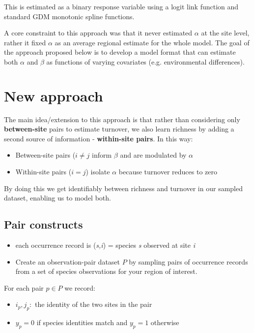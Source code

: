 \documentclass{article}
\begin{document}
This is estimated as a binary response variable using a logit link function and standard GDM monotonic spline functions.

A core constraint to this approach was that it never estimated $\alpha$ at the site level, rather it fixed $\alpha$ as an average regional estimate for the whole model. The goal of the approach proposed below is to develop a model format that can estimate both $\alpha$ and $\beta$ as functions of varying covariates (e.g. environmental differences).

\section{New approach}

The main idea/extension to this approach is that rather than considering only \textbf{between-site} pairs to estimate turnover, we also learn richness by adding a second source of information - \textbf{within-site pairs}. In this way:

\begin{itemize}
    \item Between-site pairs ($i \neq j$ inform $\beta$ and are modulated by $\alpha$
    \item Within-site pairs ($i = j$) isolate $\alpha$ because turnover reduces to zero
\end{itemize}

By doing this we get identifiably between richness and turnover in our sampled dataset, enabling us to model both.

\subsection{Pair constructs}

\begin{itemize}
    \item each occurrence record is (\textit{s,i}) = species \textit{s} observed at site \textit{i}
    \item Create an observation-pair dataset $P$ by sampling pairs of occurrence records from a set of species observations for your region of interest.
\end{itemize}

For each pair $p \in P$ we record:
\begin{itemize}
    \item $i_{p},j_{p}:$ the identity of the two sites in the pair
    \item $y_{p} = 0$ if species identities match and $y_{p} = 1$ otherwise
\end{itemize}
\end{document}
